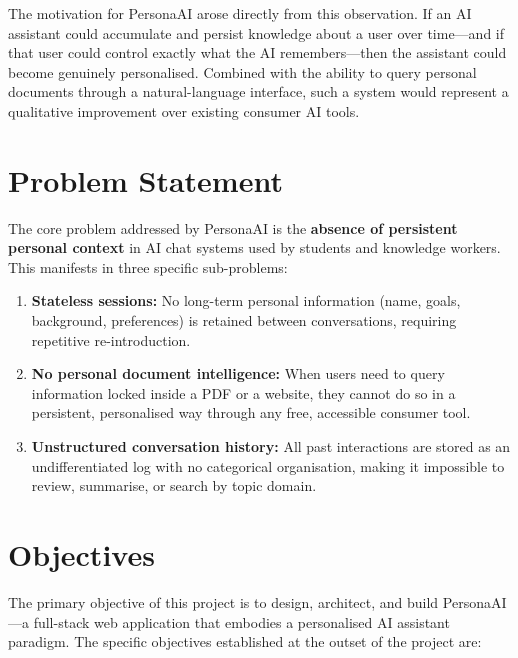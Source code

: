 \documentclass[12pt,a4paper]{report}
\begin{document}
The motivation for PersonaAI arose directly from this observation. If an AI assistant could accumulate and persist knowledge about a user over time—and if that user could control exactly what the AI remembers—then the assistant could become genuinely personalised. Combined with the ability to query personal documents through a natural-language interface, such a system would represent a qualitative improvement over existing consumer AI tools.

\section{Problem Statement}

The core problem addressed by PersonaAI is the \textbf{absence of persistent personal context} in AI chat systems used by students and knowledge workers. This manifests in three specific sub-problems:

\begin{enumerate}
  \item \textbf{Stateless sessions:} No long-term personal information (name, goals, background, preferences) is retained between conversations, requiring repetitive re-introduction.
  \item \textbf{No personal document intelligence:} When users need to query information locked inside a PDF or a website, they cannot do so in a persistent, personalised way through any free, accessible consumer tool.
  \item \textbf{Unstructured conversation history:} All past interactions are stored as an undifferentiated log with no categorical organisation, making it impossible to review, summarise, or search by topic domain.
\end{enumerate}

\section{Objectives}

The primary objective of this project is to design, architect, and build PersonaAI—a full-stack web application that embodies a personalised AI assistant paradigm. The specific objectives established at the outset of the project are:
\end{document}
